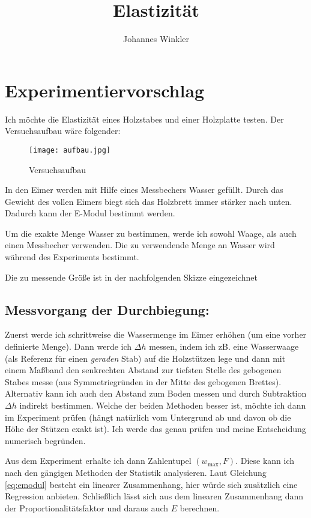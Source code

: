 \documentclass{article}
\title{Elastizität}
\author{Johannes Winkler}
\date{}
\begin{document}
 
 
 
\pagestyle{fancy}


\tableofcontents

\newpage


\setcounter{section}{-1}

\section{Experimentiervorschlag}


Ich möchte die Elastizität eines Holzstabes und einer Holzplatte testen. Der Versuchsaufbau wäre folgender:
\begin{figure}[H]
\texttt{[image: aufbau.jpg]}
\caption{Versuchsaufbau}
\end{figure}

In den Eimer werden mit Hilfe eines Messbechers Wasser gefüllt. Durch das Gewicht des vollen Eimers biegt sich das Holzbrett immer stärker nach unten. Dadurch kann der E-Modul bestimmt werden.

Um die exakte Menge Wasser zu bestimmen, werde ich sowohl Waage, als auch einen Messbecher verwenden. Die zu verwendende Menge an Wasser wird während des Experiments bestimmt.

Die zu messende Größe ist in der nachfolgenden Skizze eingezeichnet


\newpage

\subsection*{Messvorgang der Durchbiegung:}

Zuerst werde ich schrittweise die Wassermenge im Eimer erhöhen (um eine vorher definierte Menge). Dann werde ich $\Delta h$ messen, indem ich zB. eine Wasserwaage (als Referenz für einen \textit{geraden} Stab) auf die Holzstützen lege und dann mit einem Maßband den senkrechten Abstand zur tiefsten Stelle des gebogenen Stabes messe (aus Symmetriegründen in der Mitte des gebogenen Brettes). Alternativ kann ich auch den Abstand zum Boden messen und durch Subtraktion $\Delta h$ indirekt bestimmen. Welche der beiden Methoden besser ist, möchte ich dann im Experiment prüfen (hängt natürlich vom Untergrund ab und davon ob die Höhe der Stützen exakt ist). Ich werde das genau prüfen und meine Entscheidung numerisch begründen.

Aus dem Experiment erhalte ich dann Zahlentupel $(w_\text{max}, F)$. Diese kann ich nach den gängigen Methoden der Statistik analysieren. Laut Gleichung \eqref{eq:emodul} besteht ein linearer Zusammenhang, hier würde sich zusätzlich eine Regression anbieten. Schließlich lässt sich aus dem linearen Zusammenhang dann der Proportionalitätsfaktor und daraus auch $E$ berechnen.
\end{document}
